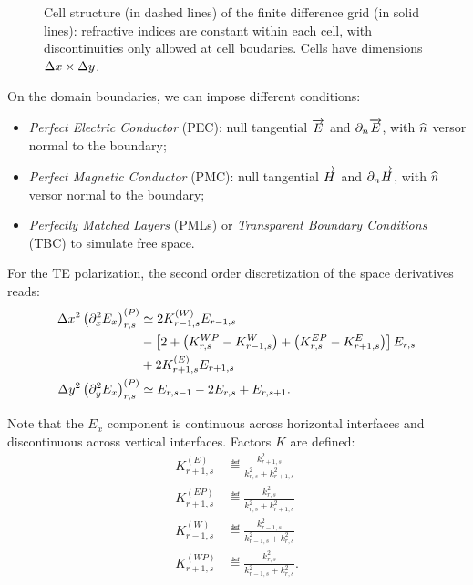 \begin{figure}[htbp]
  \begin{center}
    \resizebox{6cm}{!}{}
  \end{center}
  \caption{Cell structure (in dashed lines) of the finite difference
    grid (in solid lines): refractive indices are constant
    within each cell, with discontinuities only allowed at cell
    boudaries. Cells have dimensions $\Delta x \times \Delta y$.}
  \label{fig:stern_fig2}
\end{figure}

On the domain boundaries, we can impose different conditions:
\begin{itemize}
\item
  \emph{Perfect Electric Conductor} (PEC): null tangential $\overrightarrow{E}$ and
  $\partial_n \overrightarrow{E}$, with $\widehat{n}$ versor normal to the boundary;
\item
  \emph{Perfect Magnetic Conductor} (PMC): null tangential $\overrightarrow{H}$ and
  $\partial_n \overrightarrow{H}$, with $\widehat{n}$ versor normal to the boundary;
\item
  \emph{Perfectly Matched Layers} (PMLs) or \emph{Transparent Boundary
  Conditions} (TBC) to simulate free space.
\end{itemize}

For the TE polarization, the second order discretization of the space
derivatives reads:
\begin{equation} \label{eqn:stern_discretization} \begin{aligned}
\Delta x^2 \left( \partial_x^2 E_x \right)^{(P)}_{r,s} & \simeq 2 K^{(W)}_{r-1,s} E_{r-1,s} \\
  & - \left[ 2 + \left( K^{WP}_{r,s} - K^{W}_{r-1,s} \right) + \left(
  K^{EP}_{r,s} - K^{E}_{r+1,s} \right) \right] E_{r,s} \\
  & + 2 K^{(E)}_{r+1,s} E_{r+1,s} \\
\Delta y^2 \left( \partial_y^2 E_x \right)^{(P)}_{r,s} & \simeq E_{r,s-1} - 2 E_{r,s} + E_{r,s+1} .
\end{aligned} \end{equation}

Note that the $E_x$ component is continuous across horizontal
interfaces and discontinuous across vertical interfaces. Factors $K$
are defined:
\begin{align*}
K^{(E)}_{r+1,s}  & \eqdef \frac{k^2_{r+1,s}}{k^2_{r,s} + k^2_{r+1,s}} \\
K^{(EP)}_{r+1,s} & \eqdef \frac{k^2_{r,s}}{k^2_{r,s} + k^2_{r+1,s}} \\
K^{(W)}_{r-1,s}  & \eqdef \frac{k^2_{r-1,s}}{k^2_{r-1,s} + k^2_{r,s}} \\
K^{(WP)}_{r+1,s} & \eqdef \frac{k^2_{r,s}}{k^2_{r-1,s} + k^2_{r,s}} .
\end{align*}

